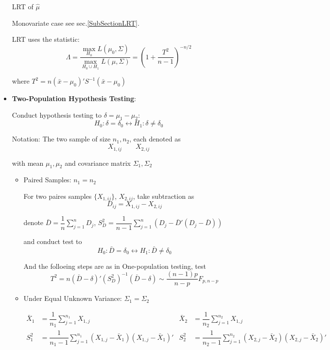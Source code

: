 \begin{itemize}[topsep=2pt,itemsep=2pt]
\begin{point}
    \hypertarget{PartHotellingT2Test}{LRT of $ \hat{\mu} $}
\end{point}

    Monovariate case see sec.\ref{SubSectionLRT}.

    LRT uses the statistic:
    \[
        \Lambda =\dfrac{\max_{H_0 }L(\mu_0,\Sigma)}{\max_{H_0\cup H_1}L(\mu,\Sigma)}=(1+\dfrac{T^2}{n-1})^{-n/2} 
    \]

    where $ T^2=n(\bar{x}-\mu_0)'S^{-1}(\bar{x}-\mu_0) $
    
\item \textbf{Two-Population Hypothesis Testing}:

    Conduct hypothesis testing to $ \delta =\mu _1-\mu _2 $:
\[
    H_0: \delta =\delta _0\longleftrightarrow H_1:\delta \neq \delta _0
\]

    Notation: The two sample of size $ n_1,n_2 $, each denoted as
    \[
        X_{1,ij}\qquad X_{2,ij} 
    \]
    
    with mean $ \mu_1,\mu_2 $ and covariance matrix $ \Sigma_1,\Sigma_2 $

    \begin{itemize}[topsep=2pt,itemsep=2pt]
        \item Paired Samples: $ n_1=n_2 $
        
        For two paires samples $ \{X_{1,ij}\} $, $ X_{2,ij} $, take subtraction as 
        \[
            D_{ij}=X_{1,ij}-X_{2,ij} 
        \]

        denote $ \bar{D}=\dfrac{1}{n}\sum_{j=1}^nD_{ j} $, $ S^2_D=\dfrac{1}{n-1}\sum_{j=1}^n(D_j-\bar{D}'(D_j-\bar{D})) $
        
        and conduct test to 
        \[
            H_0: \bar{D} =\delta _0\longleftrightarrow H_1:\bar{D} \neq \delta _0
        \]

        And the folloeing steps are as in One-population testing, test
        \[
            T^2=n(\bar{D}-\delta )'(S^2_D)^{-1}(\bar{D}-\delta )\sim \dfrac{(n-1)p}{n-p}F_{p,n-p}
        \]
        
        \item Under Equal Unknown Variance: $ \Sigma_1=\Sigma_2 $
        
        \begin{align}
            \bar{X}_1&=\dfrac{1}{n_1}\sum_{j=1}^{n_1} X_{1,j}&\bar{X}_2&=\dfrac{1}{n_2}\sum_{j=1}^{n_2} X_{1,j}\\
            S^2_1&=\dfrac{1}{n_1-1}\sum_{j=1}^{n_1}(X_{1,j}-\bar{X}_1)(X_{1,j}-\bar{X}_1)'&S^2_2&=\dfrac{1}{n_2-1}\sum_{j=1}^{n_2}(X_{2,j}-\bar{X}_2)(X_{2,j}-\bar{X}_2)'
        \end{align}
        

\end{itemize}
\end{itemize}
